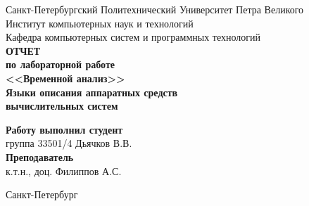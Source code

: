 \begin{titlepage}
\begin{center}
	Санкт-Петербургский Политехнический Университет Петра Великого\\[0.3cm]
	Институт компьютерных наук и технологий \\[0.3cm]
	Кафедра компьютерных систем и программных технологий\\[4cm]
	
	\textbf{ОТЧЕТ}\\ 
	\textbf{по лабораторной работе}\\[0.5cm]
	\textbf{<<Временной анализ>>}\\[0.1cm]
	\textbf{Языки описания аппаратных средств\\ вычислительных систем}\\[4.0cm]
\end{center}

\begin{flushright}
	\begin{minipage}{0.45\textwidth}
		\textbf{Работу выполнил студент}\\[3mm]
		группа 33501/4 \hspace*{9mm} Дьячков В.В.\\[5mm]
		\textbf{Преподаватель}\\[5mm]
		\sign[1.5cm] \hspace*{1mm} к.т.н., доц. Филиппов А.С. \\[5mm]
	\end{minipage}
\end{flushright}

\vfill

\begin{center}
	Санкт-Петербург\\
	\the\year
\end{center}
\end{titlepage}

\addtocounter{page}{1}